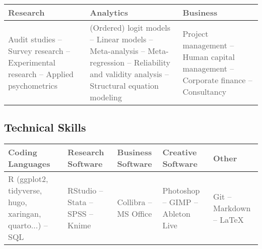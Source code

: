 \documentclass[11pt,a4paper,]{awesome-cv}
\begin{document}
\begin{table}[H]
\centering\begingroup\fontsize{9}{11}\selectfont

\begin{tabular}{>{\centering\arraybackslash}p{5.2cm}>{\centering\arraybackslash}p{5.2cm}>{\centering\arraybackslash}p{5.2cm}}
\toprule
\textcolor[HTML]{5d5d5d}{\textbf{Research}} & \textcolor[HTML]{5d5d5d}{\textbf{Analytics}} & \textcolor[HTML]{5d5d5d}{\textbf{Business}}\\
\midrule
\textcolor[HTML]{5d5d5d}{Audit studies -- Survey research -- Experimental research -- Applied psychometrics} & \textcolor[HTML]{5d5d5d}{(Ordered) logit models -- Linear models -- Meta-analysis -- Meta-regression -- Reliability and validity analysis -- Structural equation modeling} & \textcolor[HTML]{5d5d5d}{Project management -- Human capital management -- Corporate finance -- Consultancy}\\
\bottomrule
\end{tabular}
\endgroup{}
\end{table}

\hypertarget{technical-skills}{%
\subsection{Technical Skills}\label{technical-skills}}

\begin{table}[H]
\centering\begingroup\fontsize{9}{11}\selectfont

\begin{tabular}{>{\centering\arraybackslash}p{2.96cm}>{\centering\arraybackslash}p{2.96cm}>{\centering\arraybackslash}p{2.96cm}>{\centering\arraybackslash}p{2.96cm}>{\centering\arraybackslash}p{2.96cm}}
\toprule
\textcolor[HTML]{5d5d5d}{\textbf{Coding Languages}} & \textcolor[HTML]{5d5d5d}{\textbf{Research Software}} & \textcolor[HTML]{5d5d5d}{\textbf{Business Software}} & \textcolor[HTML]{5d5d5d}{\textbf{Creative Software}} & \textcolor[HTML]{5d5d5d}{\textbf{Other}}\\
\midrule
\textcolor[HTML]{5d5d5d}{R (ggplot2, tidyverse, hugo, xaringan, quarto...) -- SQL} & \textcolor[HTML]{5d5d5d}{RStudio -- Stata -- SPSS -- Knime} & \textcolor[HTML]{5d5d5d}{Collibra -- MS Office} & \textcolor[HTML]{5d5d5d}{Photoshop -- GIMP -- Ableton Live} & \textcolor[HTML]{5d5d5d}{Git -- Markdown -- LaTeX}\\
\bottomrule
\end{tabular}
\endgroup{}
\end{table}
\end{document}
